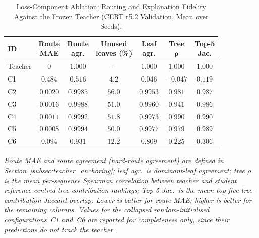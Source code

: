 \begin{table}[!tbp]
\caption{Loss-Component Ablation: Routing and Explanation Fidelity Against the
Frozen Teacher (CERT r5.2 Validation, Mean over Seeds).}
\label{tab:loss_ablation_routing}
\centering
\footnotesize
\renewcommand{\arraystretch}{1.15}
\setlength{\tabcolsep}{3pt}
\begin{tabular*}{\columnwidth}{@{\extracolsep{\fill}}lcccccc@{}}
\hline
\textbf{ID} &
\shortstack{\textbf{Route}\\\textbf{MAE}} &
\shortstack{\textbf{Route}\\\textbf{agr.}} &
\shortstack{\textbf{Unused}\\\textbf{leaves (\%)}} &
\shortstack{\textbf{Leaf}\\\textbf{agr.}} &
\shortstack{\textbf{Tree}\\\(\boldsymbol{\rho}\)} &
\shortstack{\textbf{Top-5}\\\textbf{Jac.}} \\
\hline
Teacher & $0$      & $1.000$  & --     & $1.000$  & $1.000$  & $1.000$ \\
C1      & $0.484$  & $0.516$  & $4.2$  & $0.046$  & $-0.047$ & $0.119$ \\
C2      & $0.0020$ & $0.9985$ & $56.0$ & $0.9953$ & $0.981$  & $0.987$ \\
C3      & $0.0016$ & $0.9988$ & $51.0$ & $0.9960$ & $0.941$  & $0.986$ \\
C4      & $0.0011$ & $0.9992$ & $51.8$ & $0.9973$ & $0.990$  & $0.990$ \\
C5      & $0.0008$ & $0.9994$ & $50.0$ & $0.9977$ & $0.979$  & $0.989$ \\
C6      & $0.094$  & $0.931$  & $12.2$ & $0.809$  & $0.225$  & $0.306$ \\
\hline
\end{tabular*}
\par\vspace{2pt}
\parbox{\columnwidth}{\footnotesize\raggedright\itshape Route MAE and route
agreement (hard-route agreement) are defined in
Section~\ref{subsec:teacher_anchoring}; leaf agr.\ is dominant-leaf agreement;
tree \(\rho\) is the mean per-sequence Spearman correlation between teacher and
student reference-centred tree-contribution rankings; Top-5 Jac.\ is the mean
top-five tree-contribution Jaccard overlap. Lower is better for route MAE;
higher is better for the remaining columns. Values for the collapsed
random-initialised configurations~C1 and~C6 are reported for completeness only,
since their predictions do not track the teacher.}
\end{table}

